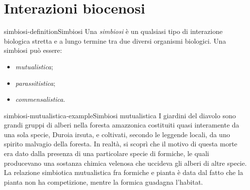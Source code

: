 \documentclass[preview]{standalone}
\begin{document}
\genpage

\section{Interazioni biocenosi}

\begin{snippetdefinition}{simbiosi-definition}{Simbiosi}
    Una \textit{simbiosi} è un qualsiasi tipo di interazione biologica stretta
    e a lungo termine tra due diversi organismi biologici.
    Una simbiosi può essere:
    \begin{itemize}
        \item \textit{mutualistica};
        \item \textit{parassitistica};
        \item \textit{commensalistica}.
    \end{itemize}
\end{snippetdefinition}

\begin{snippetexample}{simbiosi-mutualistica-example}{Simbiosi mutualistica}
    I giardini del diavolo sono grandi gruppi di alberi nella foresta amazzonica
    costituiti quasi interamente da una sola specie, Duroia
    irsuta, e coltivati, secondo le leggende locali, da uno spirito
    malvagio della foresta.
    In realtà, si scoprì che il motivo di questa morte era dato dalla presenza
    di una particolare specie di formiche, le quali producevano una sostanza
    chimica velenosa che uccideva gli alberi di altre specie.
    La relazione simbiotica mutualistica fra formiche e pianta è data dal fatto che
    la pianta non ha competizione, mentre la formica guadagna l'habitat.  
\end{snippetexample}
\end{document}

